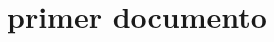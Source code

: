 \documentclass[assd_tp3_main.tex]{subfiles}
\begin{document}
\section{primer documento}
\end{document}
